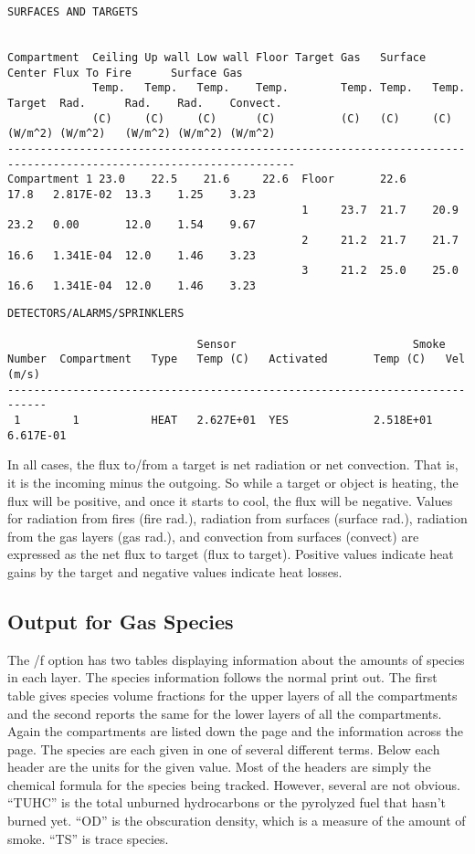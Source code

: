 \begin{lstlisting}[basicstyle=\tiny]
SURFACES AND TARGETS


Compartment  Ceiling Up wall Low wall Floor Target Gas   Surface Center Flux To Fire      Surface Gas
             Temp.   Temp.   Temp.    Temp.        Temp. Temp.   Temp.  Target  Rad.      Rad.    Rad.    Convect.
             (C)     (C)     (C)      (C)          (C)   (C)     (C)    (W/m^2) (W/m^2)   (W/m^2) (W/m^2) (W/m^2)
------------------------------------------------------------------------------------------------------------------
Compartment 1 23.0    22.5    21.6     22.6  Floor       22.6            17.8   2.817E-02  13.3    1.25    3.23
                                             1     23.7  21.7    20.9    23.2   0.00       12.0    1.54    9.67
                                             2     21.2  21.7    21.7    16.6   1.341E-04  12.0    1.46    3.23
                                             3     21.2  25.0    25.0    16.6   1.341E-04  12.0    1.46    3.23
\end{lstlisting}

\begin{lstlisting}[basicstyle=\scriptsize]
DETECTORS/ALARMS/SPRINKLERS

                             Sensor                           Smoke
Number  Compartment   Type   Temp (C)   Activated       Temp (C)   Vel (m/s)
----------------------------------------------------------------------------
 1        1           HEAT   2.627E+01  YES             2.518E+01  6.617E-01
\end{lstlisting}
In all cases, the flux to/from a target is net radiation or net convection. That is, it is the incoming minus the outgoing. So while a target or object is heating, the flux will be positive, and once it starts to cool, the flux will be negative. Values for radiation from fires (fire rad.), radiation from surfaces (surface rad.), radiation from the gas layers (gas rad.), and convection from surfaces (convect) are expressed as the net flux to target (flux to target). Positive values indicate heat gains by the target and negative values indicate heat losses.


\subsection{Output for Gas Species}

The /f option has two tables displaying information about the amounts of species in each layer. The species information follows the normal print out.  The first table gives species volume fractions for the upper layers of all the compartments and the second reports the same for the lower layers of all the compartments.  Again the compartments are listed down the page and the information across the page.  The species are each given in one of several different terms.  Below each header are the units for the given value.  Most of the headers are simply the chemical formula for the species being tracked.  However, several are not obvious.  ``TUHC'' is the total unburned hydrocarbons or the pyrolyzed fuel that hasn't burned yet.  ``OD'' is the obscuration density, which is a measure of the amount of smoke. ``TS'' is trace species.

